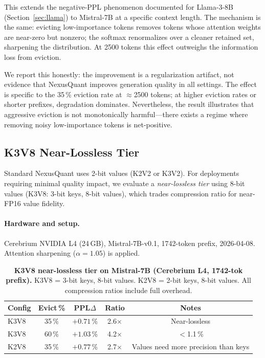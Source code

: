\documentclass{article}
\begin{document}
This extends the negative-PPL phenomenon documented for Llama-3-8B
(Section~\ref{sec:llama}) to Mistral-7B at a specific context length.  The
mechanism is the same: evicting low-importance tokens removes tokens whose
attention weights are near-zero but nonzero; the softmax renormalizes over a
cleaner retained set, sharpening the distribution.  At 2500 tokens this effect
outweighs the information loss from eviction.

We report this honestly: the improvement is a regularization artifact, not
evidence that NexusQuant improves generation quality in all settings.  The effect
is specific to the 35\,\% eviction rate at $\approx$2500 tokens; at higher eviction
rates or shorter prefixes, degradation dominates.  Nevertheless, the result
illustrates that aggressive eviction is not monotonically harmful---there exists
a regime where removing noisy low-importance tokens is net-positive.

\subsection{K3V8 Near-Lossless Tier}
\label{sec:k3v8}

Standard NexusQuant uses 2-bit values (K2V2 or K3V2).  For deployments requiring
minimal quality impact, we evaluate a \emph{near-lossless tier} using 8-bit
values (K3V8: 3-bit keys, 8-bit values), which trades compression ratio for
near-FP16 value fidelity.

\paragraph{Hardware and setup.}
Cerebrium NVIDIA L4 (24\,GB), Mistral-7B-v0.1, 1742-token prefix, 2026-04-08.
Attention sharpening ($\alpha{=}1.05$) is applied.

\begin{table}[h]
\centering
\caption{\textbf{K3V8 near-lossless tier on Mistral-7B (Cerebrium L4, 1742-tok
  prefix).} K3V8 = 3-bit keys, 8-bit values. K2V8 = 2-bit keys, 8-bit values.
  All compression ratios include full overhead.}
\label{tab:k3v8}
\begin{tabular}{@{}lcccc@{}}
\toprule
Config & Evict\,\% & PPL$\Delta$ & Ratio & Notes \\
\midrule
K3V8 & 35\,\% & $+0.71$\,\% & 2.6$\times$ & Near-lossless \\
K3V8 & 60\,\% & $+1.03$\,\% & 4.2$\times$ & $<$1.1\,\% \\
K2V8 & 35\,\% & $+0.77$\,\% & 2.7$\times$ & Values need more precision than keys \\
\bottomrule
\end{tabular}
\end{table}
\end{document}
